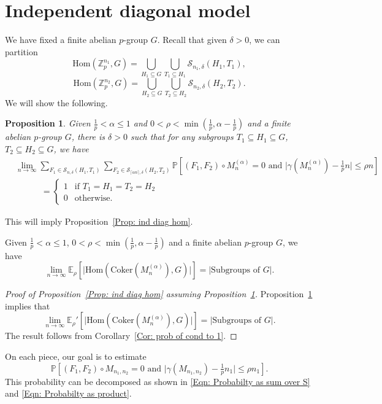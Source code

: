 \documentclass[12pt]{amsart}
\newtheorem{proposition}[theorem]{Proposition}
\theoremstyle{definition}
\newcommand{\PPP}{\mathbb{P}}
\newcommand{\SSS}[3]{\mathcal{S}_{#1}(#2,#3)}
\newcommand{\Mnot}{M_{n_1,n_2}}
\newcommand{\Mna}{M_{n}^{(\alpha)}}
\newcommand{\Erho}{\E_{\rho}}
\newcommand{\Erhop}{\E_{\rho}'}
\newcommand{\abs}[1]{\vert#1\vert}
\newcommand{\Zp}{\Z_p}
\newcommand{\E}{\mathbb{E}}
\newcommand{\Z}{\mathbb{Z}}
\newcommand{\Coker}{\text{Coker}}
\newcommand{\Hom}{\text{Hom}}
\newcommand{\ceil}[1]{\lceil#1\rceil}
\newenvironment{customprop}[1]
  {\renewcommand\theinnercustomprop{#1}\innercustomprop}
  {\endinnercustomprop}
\begin{document}
\section{Independent diagonal model}\label{Sec: ind diag dir}

We have fixed a finite abelian $p$-group $G$.
Recall that given $\delta>0$, we can partition
\[
\Hom(\Zp^{n_1},G)
=\bigcup_{H_1\subseteq G}
\bigcup_{T_1\subseteq H_1}
\SSS{n_1,\delta}{H_1}{T_1},
\]
\[
\Hom(\Zp^{n_2},G)
=\bigcup_{H_2\subseteq G}
\bigcup_{T_2\subseteq H_2}
\SSS{n_2,\delta}{H_2}{T_2}.
\]
We will show the following.
\begin{proposition}\label{Prop: ind diagonal pieces}
Given $\frac{1}{p}<\alpha\leq 1$ and $0<\rho<\min(\frac{1}{p},\alpha-\frac{1}{p})$ and a finite abelian $p$-group $G$, there is $\delta>0$ such that for any subgroups $T_1\subseteq H_1\subseteq G$, $T_2\subseteq H_2\subseteq G$, we have
\begin{align*}
&\lim_{n\to\infty}
\sum_{F_1\in \SSS{n,\delta}{H_1}{T_1}}
\sum_{F_2\in \SSS{\ceil{\alpha n},\delta}{H_2}{T_2}}
\PPP[(F_1,F_2)\circ \Mna=0 \text{ and } \abs{\gamma(\Mna)-\tfrac{1}{p}n} \leq \rho n]\\
&\quad\quad\quad=\begin{cases}
1 &\text{if } T_1=H_1=T_2=H_2\\
0 &\text{otherwise}.
\end{cases}
\end{align*}
\end{proposition}
This will imply Proposition~\ref{Prop: ind diag hom}.

\begin{customprop}{\ref{Prop: ind diag hom}}
Given $\frac{1}{p}<\alpha\leq 1$, $0<\rho<\min(\frac{1}{p},\alpha-\frac{1}{p})$  and a finite abelian $p$-group $G$, we have
\[
\lim_{n\to\infty}
\Erho[\abs{\Hom(\Coker(\Mna),G)}] =\abs{\text{Subgroups of }G}.
\]    
\end{customprop}
\begin{proof}[Proof of Proposition~\ref{Prop: ind diag hom} assuming Proposition~\ref{Prop: ind diagonal pieces}]
Proposition~\ref{Prop: ind diagonal pieces} implies that
\[
\lim_{n\to\infty}
\Erhop[\abs{\Hom(\Coker(\Mna),G)}] =\abs{\text{Subgroups of }G}.
\]
The result follows from Corollary~\ref{Cor: prob of cond to 1}.
\end{proof}






On each piece, our goal is to estimate
\[
\PPP[(F_1,F_2)\circ \Mnot=0 
\text{ and } 
\abs{\gamma(\Mnot) -\tfrac{1}{p} n_1}\leq \rho n_1].
\]
This probability can be decomposed as shown in \eqref{Eqn: Probabilty as sum over S} and \eqref{Eqn: Probabilty as product}.
\end{document}
